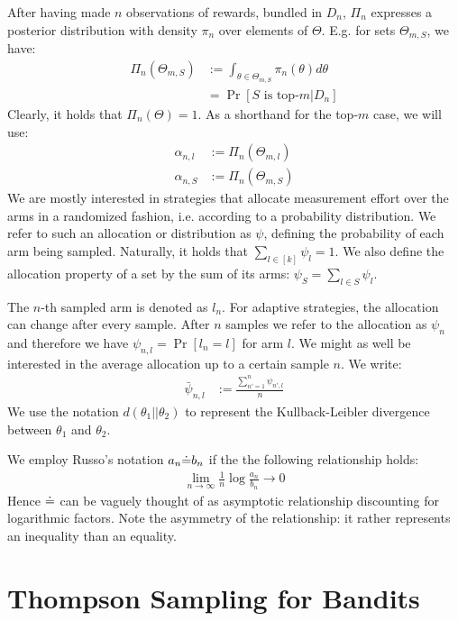 After having made $n$ observations of rewards, bundled in $D_n$, $\Pi_n$ expresses a posterior distribution with density $\pi_n$ over elements of $\Theta$. E.g. for sets $\Theta_{m, S}$, we have:
\begin{align}
  \Pi_n(\Theta_{m, S}) &:= \int_{\theta \in \Theta_{m, S}} \pi_n(\theta) d\theta \\
    &= \Pr[S \text{ is top-}m | D_n]
\end{align}
Clearly, it holds that $\Pi_n(\Theta) = 1$. As a shorthand for the top-$m$ case, we will use:
\begin{align}
  \alpha_{n, l} &:= \Pi_n(\Theta_{m, l}) \\
  \alpha_{n, S} &:= \Pi_n(\Theta_{m, S})
\end{align}
We are mostly interested in strategies that allocate measurement effort over the arms in a randomized fashion, i.e. according to a probability distribution. We refer to such an allocation or distribution as $\psi$, defining the probability of each arm being sampled. Naturally, it holds that $\sum_{l \in [k]} \psi_l = 1$. We also define the allocation property of a set by the sum of its arms: $\psi_S = \sum_{l \in S} \psi_l$.

The $n$-th sampled arm is denoted as $l_n$. For adaptive strategies, the allocation can change after every sample. After $n$ samples we refer to the allocation as $\psi_{n}$ and therefore we have $\psi_{n, l} = \Pr[l_n = l]$ for arm $l$. We might as well be interested in the average allocation up to a certain sample $n$. We write:
\begin{align}
  \bar{\psi}_{n, l} &:= \frac{\sum_{n' = 1}^{n} \psi_{n', l}}{n}
\end{align}
We use the notation $d(\theta_1||\theta_2)$ to represent the Kullback-Leibler divergence between $\theta_1$ and $\theta_2$.

We employ Russo's notation $a_n \dot{=} b_n$ if the the following relationship holds:
\begin{align}
  \lim_{n \rightarrow \infty}\frac{1}{n}\log{\frac{a_n}{b_n}} \rightarrow 0
\end{align}
Hence $\dot{=}$ can be vaguely thought of as asymptotic relationship discounting for logarithmic factors. Note the asymmetry of the relationship: it rather represents an inequality than an equality.

\section{Thompson Sampling for Bandits}

